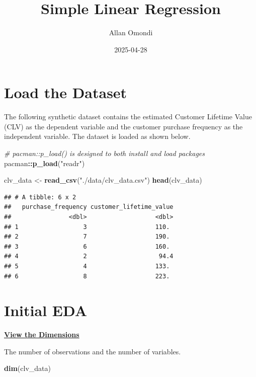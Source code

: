 \documentclass[
]{article}
\title{Simple Linear Regression}
\author{Allan Omondi}
\date{2025-04-28}
\newenvironment{Shaded}{\begin{snugshade}}{\end{snugshade}}
\newcommand{\CommentTok}[1]{\textcolor[rgb]{0.56,0.35,0.01}{\textit{#1}}}
\newcommand{\FunctionTok}[1]{\textcolor[rgb]{0.13,0.29,0.53}{\textbf{#1}}}
\newcommand{\NormalTok}[1]{#1}
\newcommand{\OtherTok}[1]{\textcolor[rgb]{0.56,0.35,0.01}{#1}}
\newcommand{\SpecialCharTok}[1]{\textcolor[rgb]{0.81,0.36,0.00}{\textbf{#1}}}
\newcommand{\StringTok}[1]{\textcolor[rgb]{0.31,0.60,0.02}{#1}}
\begin{document}
\maketitle

{
\setcounter{tocdepth}{4}
\tableofcontents
}
\section{Load the Dataset}\label{load-the-dataset}

The following synthetic dataset contains the estimated Customer Lifetime
Value (CLV) as the dependent variable and the customer purchase
frequency as the independent variable. The dataset is loaded as shown
below.

\begin{Shaded}
\begin{Highlighting}[]
\CommentTok{\# \textasciigrave{}pacman::p\_load()\textasciigrave{} is designed to both install and load packages}
\NormalTok{pacman}\SpecialCharTok{::}\FunctionTok{p\_load}\NormalTok{(}\StringTok{"readr"}\NormalTok{)}

\NormalTok{clv\_data }\OtherTok{\textless{}{-}} \FunctionTok{read\_csv}\NormalTok{(}\StringTok{"./data/clv\_data.csv"}\NormalTok{)}
\FunctionTok{head}\NormalTok{(clv\_data)}
\end{Highlighting}
\end{Shaded}

\begin{verbatim}
## # A tibble: 6 x 2
##   purchase_frequency customer_lifetime_value
##                <dbl>                   <dbl>
## 1                  3                   110. 
## 2                  7                   190. 
## 3                  6                   160. 
## 4                  2                    94.4
## 5                  4                   133. 
## 6                  8                   223.
\end{verbatim}

\section{Initial EDA}\label{initial-eda}

\ul{\textbf{View the Dimensions}}

The number of observations and the number of variables.

\begin{Shaded}
\begin{Highlighting}[]
\FunctionTok{dim}\NormalTok{(clv\_data)}
\end{Highlighting}
\end{Shaded}
\end{document}
